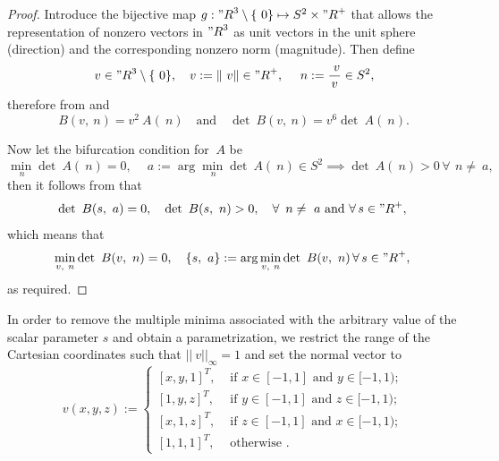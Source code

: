 \documentclass[12pt]{article}
\numberwithin{equation}{section}
\begin{document}
\begin{proof}
  Introduce the bijective map $g : {"R}^3 \setminus \{~0\}
  \mapsto S^2 \times {"R}^+$ that allows the representation of
  nonzero vectors in ${"R}^3$ as unit vectors in the unit sphere
  (direction) and the corresponding nonzero norm (magnitude). Then
  define
  \begin{equation}
    ~v \in {"R}^3 \setminus \{~0\},
    \quad
    v := \| ~v \| \in {"R}^+,
    \quad
    ~n := \frac{~v}{v} \in S^2,
  \end{equation}
  therefore from  and
  \begin{equation} \label{eq:Cartesian-from-acoustic}
      ~B(v, ~n)
      =
      v^2 ~A(~n)
      \quad \text{and} \quad
      \det ~B(v, ~n) = v^6 \det ~A(~n).
  \end{equation}

  Now let the bifurcation condition for $~A$ be
  \begin{equation}
    \min_{~n} \det ~A(~n) = 0,
    \quad
    ~a := \arg \min_{~n} \det ~A(~n) \in S^2
    \implies
    \det ~A(~n) > 0 \, \forall \, ~n \neq ~a,
  \end{equation}
  then it follows from  that
  \begin{equation}
    \det ~B(s, ~a) = 0,
    \quad
    \det ~B(s, ~n) > 0,
    \quad \forall \, ~n \neq ~a
    \text{ and } \forall \, s \in {"R}^+,
  \end{equation}
  which means that
  \begin{equation}
    \min_{v, ~n} \det ~B(v, ~n) = 0,
    \quad
    \{s, ~a\} := \arg \min_{v, ~n} \det ~B(v, ~n)
    \,
    \forall \, s \in {"R}^+,
  \end{equation}
  as required.
\end{proof}

In order to remove the multiple minima associated with the arbitrary
value of the scalar parameter $s$ and obtain a parametrization, we
restrict the range of the Cartesian coordinates such that
$||~v||_{\infty} = 1$ and set the normal vector to
\begin{equation}
  ~v(x,y,z)
  :=
  \begin{cases}
    [x,y,1]^T,
    &
    \text{ if }x \in [-1,1] \text{ and } y \in [-1,1);
    \\
    [1,y,z]^T,
    &
    \text{ if }y \in [-1,1] \text{ and } z \in [-1,1);
    \\
    [x,1,z]^T,
    &
    \text{ if }z \in [-1,1] \text{ and } x \in [-1,1);
    \\
    [1,1,1]^T,
    &
    \text{ otherwise }.
  \end{cases}
\end{equation}
\end{document}
